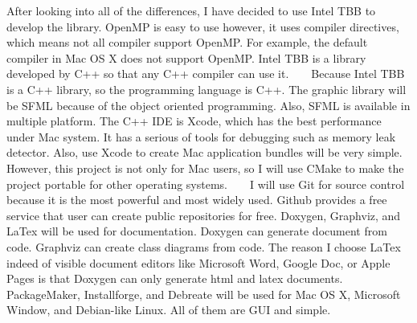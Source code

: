 After looking into all of the differences, I have decided to use Intel T\+B\+B to develop the library. Open\+M\+P is easy to use however, it uses compiler directives, which means not all compiler support Open\+M\+P. For example, the default compiler in Mac O\+S X does not support Open\+M\+P. Intel T\+B\+B is a library developed by C++ so that any C++ compiler can use it. ~\newline
~\newline
Because Intel T\+B\+B is a C++ library, so the programming language is C++. The graphic library will be S\+F\+M\+L because of the object oriented programming. Also, S\+F\+M\+L is available in multiple platform. The C++ I\+D\+E is Xcode, which has the best performance under Mac system. It has a serious of tools for debugging such as memory leak detector. Also, use Xcode to create Mac application bundles will be very simple. However, this project is not only for Mac users, so I will use C\+Make to make the project portable for other operating systems. ~\newline
~\newline
I will use Git for source control because it is the most powerful and most widely used. Github provides a free service that user can create public repositories for free. Doxygen, Graphviz, and La\+Tex will be used for documentation. Doxygen can generate document from code. Graphviz can create class diagrams from code. The reason I choose La\+Tex indeed of visible document editors like Microsoft Word, Google Doc, or Apple Pages is that Doxygen can only generate html and latex documents. ~\newline
~\newline
Package\+Maker, Installforge, and Debreate will be used for Mac O\+S X, Microsoft Window, and Debian-\/like Linux. All of them are G\+U\+I and simple. 